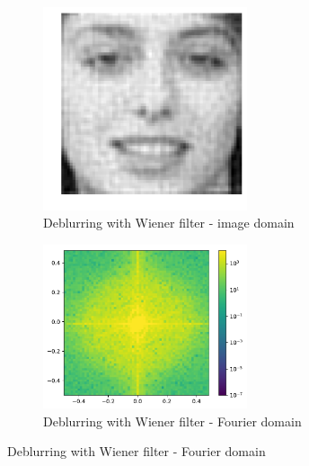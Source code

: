 \documentclass[12pt,twoside]{article}
\begin{document}
\begin{enumerate}
\begin{enumerate}
    \begin{figure}[H] 
\captionsetup[subfigure]{labelformat=empty}
\centering
   \begin{subfigure}[]{.5\textwidth}
   \centering
        \includegraphics[width=60mm]{code/wienerimages/DeBlurNoisyImage.pdf}
	\caption{Deblurring with Wiener filter  - image domain}
    \end{subfigure}%
   \begin{subfigure}[]{.5\textwidth}
   \centering   
        \includegraphics[width=60mm]{code/wienerimages/DeBlurNoisyImageFFT.pdf}
        \caption{Deblurring with Wiener filter - Fourier domain}
    \end{subfigure}%
\end{figure}



  \end{enumerate}

 \end{enumerate}
\end{document}
